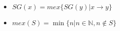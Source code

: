 \begin{itemize}

    \item $SG(x) = mex\{SG(y)|x\rightarrow y\}$
    \item $mex(S) = \min\{n|n\in\mathbb{N}, n\notin S\}$

\end{itemize}